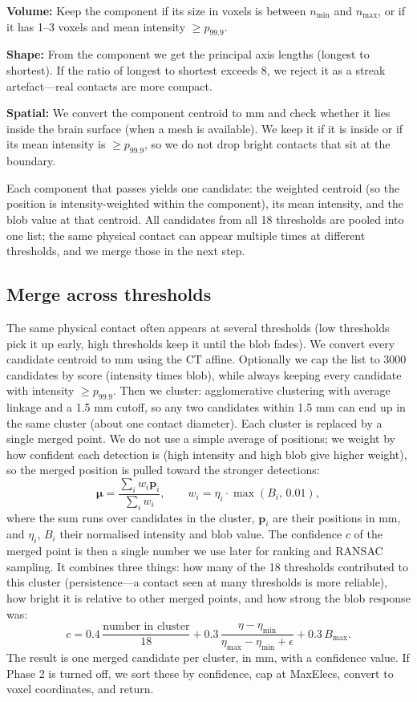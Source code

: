 \documentclass[11pt,a4paper]{article}
\newcommand{\vp}{\mathbf{p}}
\newcommand{\vm}{\boldsymbol{\mu}}
\begin{document}
\textbf{Volume:} Keep the component if its size in voxels is between \(n_{\min}\) and \(n_{\max}\), or if it has 1--3 voxels and mean intensity \(\geq p_{99.9}\).

\textbf{Shape:} From the component we get the principal axis lengths (longest to shortest). If the ratio of longest to shortest exceeds 8, we reject it as a streak artefact---real contacts are more compact.

\textbf{Spatial:} We convert the component centroid to mm and check whether it lies inside the brain surface (when a mesh is available). We keep it if it is inside or if its mean intensity is \(\geq p_{99.9}\), so we do not drop bright contacts that sit at the boundary.

Each component that passes yields one candidate: the weighted centroid (so the position is intensity-weighted within the component), its mean intensity, and the blob value at that centroid. All candidates from all 18 thresholds are pooled into one list; the same physical contact can appear multiple times at different thresholds, and we merge those in the next step.

\subsection{Merge across thresholds}
The same physical contact often appears at several thresholds (low thresholds pick it up early, high thresholds keep it until the blob fades). We convert every candidate centroid to mm using the CT affine. Optionally we cap the list to 3000 candidates by score (intensity times blob), while always keeping every candidate with intensity \(\geq p_{99.9}\). Then we cluster: agglomerative clustering with average linkage and a 1.5 mm cutoff, so any two candidates within 1.5 mm can end up in the same cluster (about one contact diameter). Each cluster is replaced by a single merged point. We do not use a simple average of positions; we weight by how confident each detection is (high intensity and high blob give higher weight), so the merged position is pulled toward the stronger detections:
\[
\vm = \frac{\sum_i w_i \vp_i}{\sum_i w_i}, \qquad
w_i = \eta_i \cdot \max(B_i,\, 0.01),
\]
where the sum runs over candidates in the cluster, \(\vp_i\) are their positions in mm, and \(\eta_i\), \(B_i\) their normalised intensity and blob value. The confidence \(c\) of the merged point is then a single number we use later for ranking and RANSAC sampling. It combines three things: how many of the 18 thresholds contributed to this cluster (persistence---a contact seen at many thresholds is more reliable), how bright it is relative to other merged points, and how strong the blob response was:
\[
c = 0.4\,\frac{\text{number in cluster}}{18} + 0.3\,\frac{\eta - \eta_{\min}}{\eta_{\max} - \eta_{\min} + \epsilon} + 0.3\,B_{\max}.
\]
The result is one merged candidate per cluster, in mm, with a confidence value. If Phase 2 is turned off, we sort these by confidence, cap at MaxElecs, convert to voxel coordinates, and return.
\end{document}
